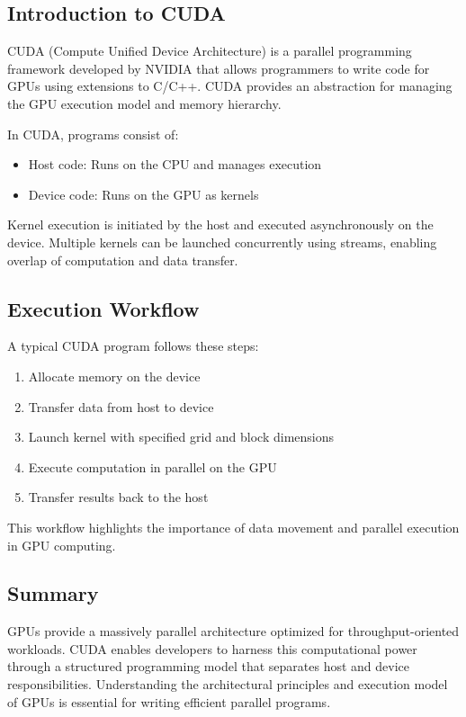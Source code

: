 \subsection{Introduction to CUDA}

CUDA (Compute Unified Device Architecture) is a parallel programming framework developed by NVIDIA that allows programmers to write code for GPUs using extensions to C/C++. CUDA provides an abstraction for managing the GPU execution model and memory hierarchy.

In CUDA, programs consist of:
\begin{itemize}
    \item Host code: Runs on the CPU and manages execution
    \item Device code: Runs on the GPU as kernels
\end{itemize}

Kernel execution is initiated by the host and executed asynchronously on the device. Multiple kernels can be launched concurrently using streams, enabling overlap of computation and data transfer. \cite{cuda_lecture}

\subsection{Execution Workflow}

A typical CUDA program follows these steps:
\begin{enumerate}
    \item Allocate memory on the device
    \item Transfer data from host to device
    \item Launch kernel with specified grid and block dimensions
    \item Execute computation in parallel on the GPU
    \item Transfer results back to the host
\end{enumerate}

This workflow highlights the importance of data movement and parallel execution in GPU computing.

\subsection{Summary}

GPUs provide a massively parallel architecture optimized for throughput-oriented workloads. CUDA enables developers to harness this computational power through a structured programming model that separates host and device responsibilities. Understanding the architectural principles and execution model of GPUs is essential for writing efficient parallel programs.
\newpage
